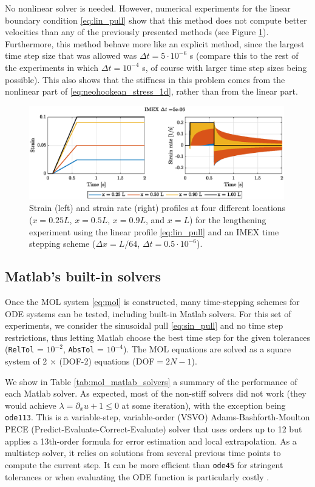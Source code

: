 \documentclass{sfuthesis}
\numberwithin{equation}{section}
\numberwithin{figure}{chapter}
\numberwithin{table}{chapter}
\theoremstyle{definition}
\begin{document}
No nonlinear solver is needed. However, numerical experiments for the linear boundary condition \eqref{eq:lin_pull} show that this method does not compute better velocities than any of the previously presented methods (see Figure \ref{fig:lin_pull_imex}). Furthermore, this method behave more like an explicit method, since the largest time step size that was allowed was $\Delta t = 5 \cdot 10^{-6}$ s (compare this to the rest of the experiments in which $\Delta t  = 10^{-4}$ s, of course with larger time step sizes being possible). This also shows that the stiffness in this problem comes from the nonlinear part of \eqref{eq:neohookean_stress_1d}, rather than from the linear part.

\begin{figure}
    \centering
    \includegraphics[width=0.99\textwidth]{nh_imex.eps}
    \caption{Strain (left) and strain rate (right) profiles at four different locations ($x = 0.25L$, $x=0.5L$, $x=0.9L$, and $x=L$) for the lengthening experiment using the linear profile \eqref{eq:lin_pull} and an IMEX time stepping scheme ($\Delta x = L/64$, $\Delta t = 0.5 \cdot 10^{-6}$).
    \label{fig:lin_pull_imex}}
\end{figure}

\subsection*{Matlab's built-in solvers}

Once the MOL system \eqref{eq:mol} is constructed, many time-stepping schemes for ODE
systems can be tested, including built-in Matlab solvers. For this set of
experiments, we consider the sinusoidal pull \eqref{eq:sin_pull} and no time step restrictions, thus letting Matlab choose the best time step for the given tolerances
(\texttt{RelTol} = $10^{-2}$, \texttt{AbsTol} = $10^{-4}$). The MOL equations are solved as a square system of 2 $\times$ (DOF-2) equations (DOF$=2N-1$). 

We show in Table \ref{tab:mol_matlab_solvers} a summary of the performance of 
each Matlab solver. As expected, most of the non-stiff
solvers did not work (they would achieve $\lambda = \partial_x u + 1 \leq 0$ at
some iteration), with the exception being \texttt{ode113}. This is a variable-step, variable-order (VSVO) Adams-Bashforth-Moulton PECE (Predict-Evaluate-Correct-Evaluate) solver that uses orders up to 12 but applies a 13th-order formula for error estimation and local extrapolation. As a multistep solver, it relies on solutions from several previous time points to compute the current step. It can be more efficient than \texttt{ode45} for stringent tolerances or when evaluating the ODE function is particularly costly \cite{ShampineReichelt1997}.
\end{document}
